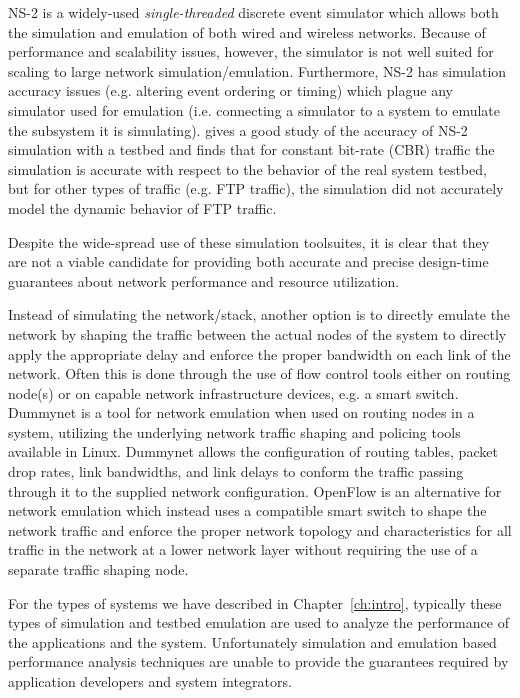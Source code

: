 NS-2\cite{ns2_real_time2004} is a widely-used \textit{single-threaded}
discrete event simulator which allows both the simulation and
emulation of both wired and wireless networks.  Because of performance
and scalability issues, however, the simulator is not well suited for
scaling to large network simulation/emulation.  Furthermore, NS-2 has
simulation accuracy issues (e.g. altering event ordering or timing)
which plague any simulator used for emulation (i.e. connecting a
simulator to a system to emulate the subsystem it is
simulating). \cite{simulator_comparison_2003} gives a good study of
the accuracy of NS-2 simulation with a testbed and finds that for
constant bit-rate (CBR) traffic the simulation is accurate with
respect to the behavior of the real system testbed, but for other
types of traffic (e.g. FTP traffic), the simulation did not accurately
model the dynamic behavior of FTP traffic.

Despite the wide-spread use of these simulation toolsuites, it is
clear that they are not a viable candidate for providing both accurate
and precise design-time guarantees about network performance and
resource utilization.

Instead of simulating the network/stack, another option is to directly
emulate the network by shaping the traffic between the actual nodes of
the system to directly apply the appropriate delay and enforce the
proper bandwidth on each link of the network.  Often this is done
through the use of flow control tools either on routing node(s) or on
capable network infrastructure devices, e.g. a smart switch.
Dummynet\cite{dummynet1997}\cite{dummynetRevisited2010} is a tool for
network emulation when used on routing nodes in a system, utilizing
the underlying network traffic shaping and policing tools available in
Linux.  Dummynet allows the configuration of routing tables, packet
drop rates, link bandwidths, and link delays to conform the traffic
passing through it to the supplied network configuration.
OpenFlow\cite{openflow2009openflow} is an alternative for network
emulation which instead uses a compatible smart switch to shape the
network traffic and enforce the proper network topology and
characteristics for all traffic in the network at a lower network
layer without requiring the use of a separate traffic shaping node.

For the types of systems we have described in Chapter~\ref{ch:intro},
typically these types of simulation and testbed emulation are used to
analyze the performance of the applications and the system.
Unfortunately simulation and emulation based performance analysis
techniques are unable to provide the guarantees required by
application developers and system integrators.

